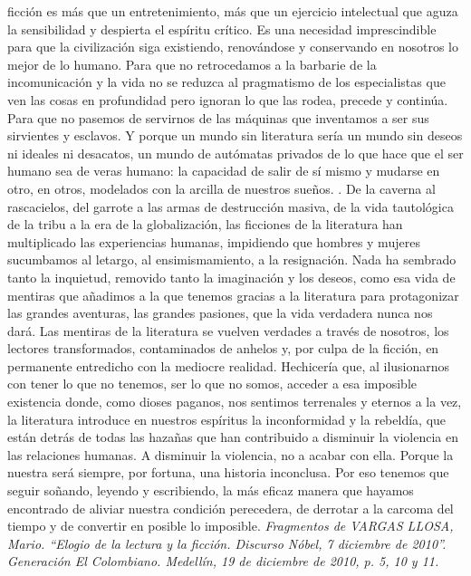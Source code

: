\documentclass[a4paper,10pt]{article}\usepackage[utf8]{inputenc}\usepackage[spanish]{babel}\usepackage{times}
\begin{document}
ficción es más que un entretenimiento, más que un ejercicio intelectual que aguza la sensibilidad y despierta el espíritu crítico. Es una necesidad imprescindible para que la civilización siga existiendo, renovándose y conservando en nosotros lo mejor de lo humano. Para que no retrocedamos a la barbarie de la incomunicación y la vida no se reduzca al pragmatismo de los especialistas que ven las cosas en profundidad pero ignoran lo que las rodea, precede y continúa. Para que no pasemos de servirnos de las máquinas que inventamos a ser sus sirvientes y esclavos. Y porque un mundo sin literatura sería un mundo sin deseos ni ideales ni desacatos, un mundo de autómatas privados de lo que hace que el ser humano sea de veras humano: la capacidad de salir de sí mismo y mudarse en otro, en otros, modelados con la arcilla de nuestros sueños. . De la caverna al rascacielos, del garrote a las armas de destrucción masiva, de la vida tautológica de la tribu a la era de la globalización, las ficciones de la literatura han multiplicado las experiencias humanas, impidiendo que hombres y mujeres sucumbamos al letargo, al ensimismamiento, a la resignación. Nada ha sembrado tanto la inquietud, removido tanto la imaginación y los deseos, como esa vida de mentiras que añadimos a la que tenemos gracias a la literatura para protagonizar las grandes aventuras, las grandes pasiones, que la vida verdadera nunca nos dará. Las mentiras de la literatura se vuelven verdades a través de nosotros, los lectores transformados, contaminados de anhelos y, por culpa de la ficción, en permanente entredicho con la mediocre realidad. Hechicería que, al ilusionarnos con tener lo que no tenemos, ser lo que no somos, acceder a esa imposible existencia donde, como dioses paganos, nos sentimos terrenales y eternos a la vez, la literatura introduce en nuestros espíritus la inconformidad y la rebeldía, que están detrás de todas las hazañas que han contribuido a disminuir la violencia en las relaciones humanas. A disminuir la violencia, no a acabar con ella. Porque la nuestra será siempre, por fortuna, una historia inconclusa. Por eso tenemos que seguir soñando, leyendo y escribiendo, la más eficaz manera que hayamos encontrado de aliviar nuestra condición perecedera, de derrotar a la carcoma del tiempo y de convertir en posible lo imposible. \newline \textsl{ Fragmentos de VARGAS LLOSA, Mario. “Elogio de la lectura y la ficción. Discurso Nóbel, 7 diciembre de 2010”. Generación  El Colombiano. Medellín, 19 de diciembre de 2010, p. 5, 10 y 11. } \newline
\end{document}
